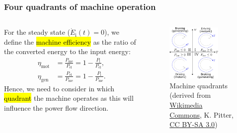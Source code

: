 \begin{frame}
	\frametitle{Four quadrants of machine operation}
	\begin{columns}
		\begin{column}{0.5\textwidth}
			For the steady state ($\dot{E}_{\mathrm{i}}(t)=0$), we define the \hl{machine efficiency} as the ratio of the converted energy to the input energy:
			\begin{align}
				\eta_\mathrm{mot} &= \frac{P_{\mathrm{me}}}{P_{\mathrm{el}}} = 1- \frac{P_{\mathrm{l}}}{P_{\mathrm{el}}},\\[0.5em]
				\eta_\mathrm{gen} &= \frac{P_{\mathrm{el}}}{P_{\mathrm{me}}} = 1- \frac{P_{\mathrm{l}}}{P_{\mathrm{me}}}.
			\end{align}
			Hence, we need to consider in which \hl{quadrant} the machine operates as this will influence the power flow direction.
		\end{column}
		\begin{column}{0.5\textwidth}
			\begin{figure}
				\centering
				\includegraphics[width=0.75\textwidth]{fig/lec01/Machine_quadrants.pdf}
				\caption{Machine quadrants (derived from \href{https://de.wikipedia.org/wiki/Datei:Vierquadranten.svg}{Wikimedia Commons}, K. Pitter, \href{https://creativecommons.org/licenses/by-sa/3.0/deed.de}{CC BY-SA 3.0})}
			\end{figure}
		\end{column}
		\end{columns}
\end{frame}


